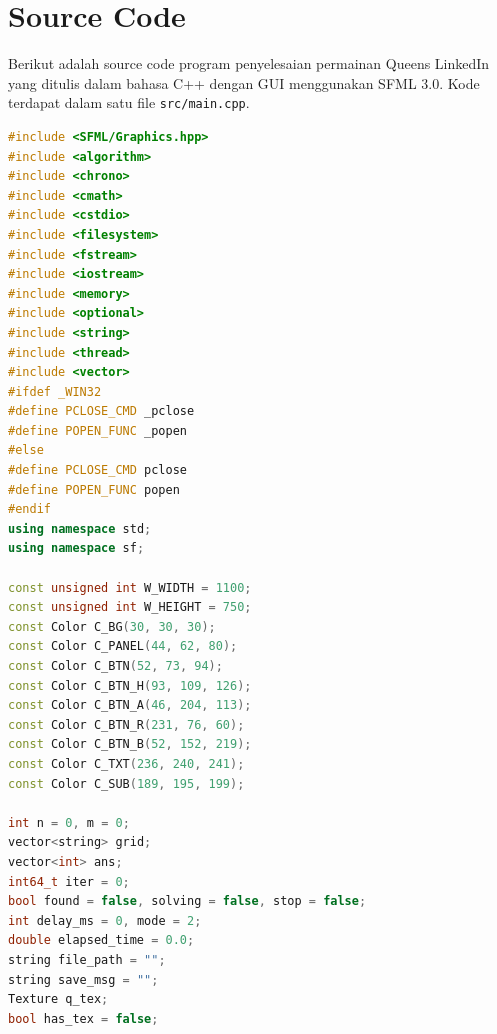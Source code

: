 \chapter{Source Code}

Berikut adalah source code program penyelesaian permainan Queens LinkedIn yang ditulis dalam bahasa C++ dengan GUI menggunakan SFML 3.0. Kode terdapat dalam satu file \texttt{src/main.cpp}.

\begin{lstlisting}[language=C++, caption={main.cpp --- Aplikasi Penyelesaian Queens LinkedIn (C++/SFML)}]
#include <SFML/Graphics.hpp>
#include <algorithm>
#include <chrono>
#include <cmath>
#include <cstdio>
#include <filesystem>
#include <fstream>
#include <iostream>
#include <memory>
#include <optional>
#include <string>
#include <thread>
#include <vector>
#ifdef _WIN32
#define PCLOSE_CMD _pclose
#define POPEN_FUNC _popen
#else
#define PCLOSE_CMD pclose
#define POPEN_FUNC popen
#endif
using namespace std;
using namespace sf;

const unsigned int W_WIDTH = 1100;
const unsigned int W_HEIGHT = 750;
const Color C_BG(30, 30, 30);
const Color C_PANEL(44, 62, 80);
const Color C_BTN(52, 73, 94);
const Color C_BTN_H(93, 109, 126);
const Color C_BTN_A(46, 204, 113);
const Color C_BTN_R(231, 76, 60);
const Color C_BTN_B(52, 152, 219);
const Color C_TXT(236, 240, 241);
const Color C_SUB(189, 195, 199);

int n = 0, m = 0;
vector<string> grid;
vector<int> ans;
int64_t iter = 0;
bool found = false, solving = false, stop = false;
int delay_ms = 0, mode = 2;
double elapsed_time = 0.0;
string file_path = "";
string save_msg = "";
Texture q_tex;
bool has_tex = false;


\end{lstlisting}
